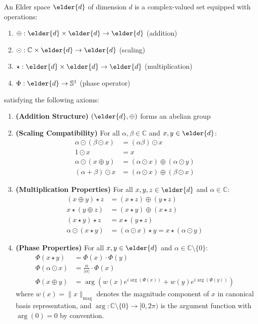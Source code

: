 \begin{definition}
An Elder space $\elder{d}$ of dimension $d$ is a complex-valued set equipped with operations:
\begin{enumerate}
    \item $\oplus: \elder{d} \times \elder{d} \rightarrow \elder{d}$ (addition)
    \item $\odot: \mathbb{C} \times \elder{d} \rightarrow \elder{d}$ (scaling)
    \item $\star: \elder{d} \times \elder{d} \rightarrow \elder{d}$ (multiplication)
    \item $\Phi: \elder{d} \rightarrow \mathbb{S}^1$ (phase operator)
\end{enumerate}
satisfying the following axioms:
\begin{enumerate}[label=\textbf{A\arabic*}]
    \item \textbf{(Addition Structure)} $(\elder{d}, \oplus)$ forms an abelian group
    \item \textbf{(Scaling Compatibility)} For all $\alpha, \beta \in \mathbb{C}$ and $x, y \in \elder{d}$:
    \begin{align}
        \alpha \odot (\beta \odot x) &= (\alpha\beta) \odot x\\
        1 \odot x &= x\\
        \alpha \odot (x \oplus y) &= (\alpha \odot x) \oplus (\alpha \odot y)\\
        (\alpha + \beta) \odot x &= (\alpha \odot x) \oplus (\beta \odot x)
    \end{align}
    
    \item \textbf{(Multiplication Properties)} For all $x, y, z \in \elder{d}$ and $\alpha \in \mathbb{C}$:
    \begin{align}
        (x \oplus y) \star z &= (x \star z) \oplus (y \star z)\\
        x \star (y \oplus z) &= (x \star y) \oplus (x \star z)\\
        (x \star y) \star z &= x \star (y \star z)\\
        \alpha \odot (x \star y) &= (\alpha \odot x) \star y = x \star (\alpha \odot y)
    \end{align}
    
    \item \textbf{(Phase Properties)} For all $x, y \in \elder{d}$ and $\alpha \in \mathbb{C} \setminus \{0\}$:
    \begin{align}
        \Phi(x \star y) &= \Phi(x) \cdot \Phi(y)\\
        \Phi(\alpha \odot x) &= \frac{\alpha}{|\alpha|} \cdot \Phi(x)\\
        \Phi(x \oplus y) &= \arg\left(w(x)e^{i\arg(\Phi(x))} + w(y)e^{i\arg(\Phi(y))}\right)
    \end{align}
    where $w(x) = \|x\|_{\text{mag}}$ denotes the magnitude component of $x$ in canonical basis representation, and $\arg: \mathbb{C} \setminus \{0\} \rightarrow [0, 2\pi)$ is the argument function with $\arg(0) = 0$ by convention.
\end{enumerate}
\end{definition}

